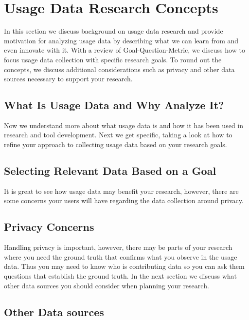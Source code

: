 
\section{Usage Data Research Concepts}

In this section we discuss background on usage data research and provide motivation for analyzing usage data by describing what we can learn from and even innovate with it.  With a review of Goal-Question-Metric, we discuss how to focus usage data collection with specific research goals.  To round out the concepts, we discuss additional considerations such as privacy and other data sources necessary to support your research.  

\subsection{What Is Usage Data and Why Analyze It?}


Now we understand more about what usage data is and how it has been used in research and tool development.  Next we get specific, taking a look at how to refine your approach to collecting usage data based on your research goals.

\subsection{Selecting Relevant Data Based on a Goal}


It is great to see how usage data may benefit your research, however, there are some concerns your users will have regarding the data collection around privacy.  

\subsection{Privacy Concerns}


Handling privacy is important, however, there may be parts of your research where you need the ground truth that confirms what you observe in the usage data.  Thus you may need to know who is contributing data so you can ask them questions that establish the ground truth.  In the next section we discuss what other data sources you should consider when planning your research.

\subsection{Other Data sources}


